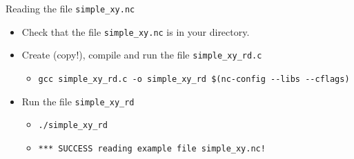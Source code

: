 \documentclass[compress,11pt,xcolor=svgnames,aspectratio=169]{beamer}
\begin{document}
\begin{frame}[fragile]{Reading the file \texttt{simple\_xy.nc}}

\begin{itemize}
\setlength\itemsep{0.6cm}

  \item Check that the file \verb|simple_xy.nc| is in your directory.

  \item Create (copy!), compile and run the file \verb|simple_xy_rd.c|\\[0.4cm]

        \begin{itemize}
          \item {\tiny  \verb|gcc simple_xy_rd.c -o simple_xy_rd $(nc-config --libs --cflags)| }\\[0.4cm]
        \end{itemize}

  \item Run the file \verb|simple_xy_rd|

        \begin{itemize}

          \item {\tiny  \verb|./simple_xy_rd|}

          \item {\tiny  \verb|*** SUCCESS reading example file simple_xy.nc!|}

        \end{itemize}

\end{itemize}

\end{frame}

\acknowledgement
\end{document}
